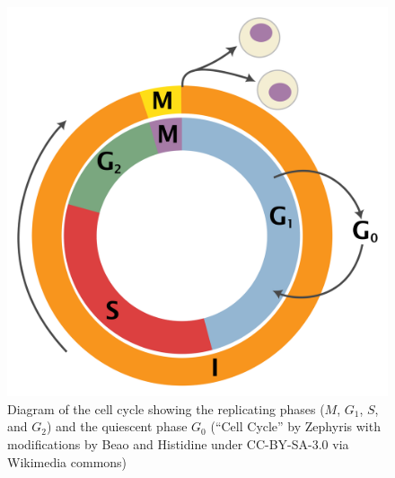 \documentclass[
  letterpaper,
  DIV=11,
  numbers=noendperiod]{scrreprt}
\begin{document}
\begin{figure}

{\centering \includegraphics{./ch10/2000px-Cell_Cycle.png}

}

\caption{Diagram of the cell cycle showing the replicating phases
(\(M\), \(G_1\), \(S\), and \(G_2\)) and the quiescent phase \(G_0\)
(``Cell Cycle'' by Zephyris with modifications by Beao and Histidine
under CC-BY-SA-3.0 via Wikimedia commons)}

\end{figure}
\end{document}
